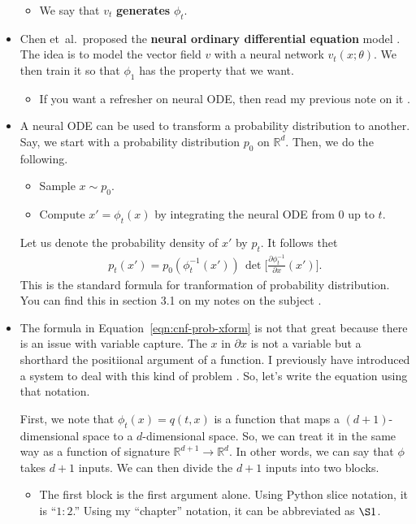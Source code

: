 \documentclass[10pt]{article}
\newcommand{\etal}{{et~al.}}
\newcommand{\ra}{\rightarrow}
\newcommand{\Real}{\mathbb{R}}
\begin{document}
\begin{itemize}
\begin{itemize}
    \item We say that $v_t$ {\bf generates} $\phi_t$.
  \end{itemize}

  \item Chen \etal\ proposed the {\bf neural ordinary differential equation} model \cite{Chen:2019}. The idea is to model the vector field $v$ with a neural network $v_t(x;\theta)$. We then train it so that $\phi_1$ has the property that we want.
  \begin{itemize}
    \item If you want a refresher on neural ODE, then read my previous note on it \cite{Khungurn:neuralODE}.
  \end{itemize}
  
  \item A neural ODE can be used to transform a probability distribution to another. Say, we start with a probability distribution $p_0$ on $\Real^d$. Then, we do the following.
  \begin{itemize}
    \item Sample $x \sim p_0$.
    \item Compute $x' = \phi_t(x)$ by integrating the neural ODE from 0 up to $t$.
  \end{itemize}
  Let us denote the probability density of $x'$ by $p_t$. It follows thet
  \begin{align}
    p_t(x') = p_0(\phi_t^{-1}(x'))\, \det \bigg[ \frac{\partial \phi_t^{-1}}{\partial x}(x') \bigg]. \label{eqn:cnf-prob-xform}
  \end{align}
  This is the standard formula for tranformation of probability distribution. You can find this in section 3.1 on my notes on the subject \cite{Khungurn:ProbXform}.

  \item The formula in Equation~\eqref{eqn:cnf-prob-xform} is not that great because there is an issue with variable capture. The $x$ in $\partial x$ is not a variable but a shorthard the positiional argument of a function. I previously have introduced a system to deal with this kind of problem \cite{Khungurn:Notation}. So, let's write the equation using that notation.
  
  First, we note that $\phi_t(x) = q(t,x)$ is a function that maps a $(d+1)$-dimensional space to a $d$-dimensional space. So, we can treat it in the same way as a function of signature $\Real^{d+1} \ra \Real^d$. In other words, we can say that $\phi$ takes $d+1$ inputs. We can then divide the $d+1$ inputs into two blocks.
  \begin{itemize}
    \item The first block is the first argument alone. Using Python slice notation, it is ``$1:2$.'' Using my ``chapter'' notation, it can be abbreviated as $\S 1$.
    

\end{itemize}
\end{itemize}
\end{document}
